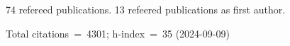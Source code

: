 74 refereed publications. 13 refeered publications as first author.

Total citations~=~4301; h-index~=~35 (2024-09-09)